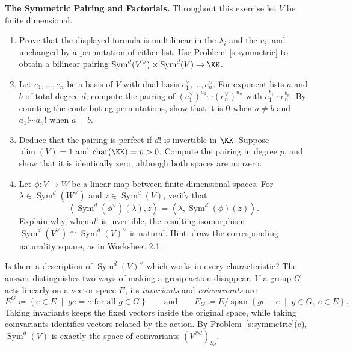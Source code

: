 \documentclass[12pt,reqno]{amsart}
\DeclareMathOperator{\Sym}{Sym}
\begin{document}
\begin{problems}
\item\label{s:pairing} \textbf{The Symmetric Pairing and Factorials.} Throughout this exercise let $V$ be finite dimensional.
\begin{enumerate}
\item Prove that the displayed formula is multilinear in the $\lambda_i$ and the $v_i$, and unchanged by a permutation of either list. Use Problem~\ref{s:symmetric} to obtain a bilinear pairing $\Sym^d(V^{\vee})\times\Sym^d(V)\to\KK$.
\item Let $e_1,\ldots,e_n$ be a basis of $V$ with dual basis $e_1^{\vee},\ldots,e_n^{\vee}$. For exponent lists $a$ and $b$ of total degree $d$, compute the pairing of $(e_1^{\vee})^{a_1}\cdots(e_n^{\vee})^{a_n}$ with $e_1^{b_1}\cdots e_n^{b_n}$. By counting the contributing permutations, show that it is $0$ when $a\ne b$ and $a_1!\cdots a_n!$ when $a=b$.
\item Deduce that the pairing is perfect if $d!$ is invertible in $\KK$. Suppose $\dim(V)=1$ and $\operatorname{char}(\KK)=p>0$. Compute the pairing in degree $p$, and show that it is identically zero, although both spaces are nonzero.
\item Let $\phi:V\to W$ be a linear map between finite-dimensional spaces. For $\lambda\in\Sym^d(W^{\vee})$ and $z\in\Sym^d(V)$, verify that
\[
\left\langle\Sym^d(\phi^{\vee})(\lambda),z\right\rangle=\left\langle\lambda,\Sym^d(\phi)(z)\right\rangle.
\]
Explain why, when $d!$ is invertible, the resulting isomorphism $\Sym^d(V^{\vee})\cong\Sym^d(V)^{\vee}$ is natural. Hint: draw the corresponding naturality square, as in Worksheet 2.1.
\end{enumerate}
\end{problems}

\hrulefill

Is there a description of $\Sym^d(V)^{\vee}$ which works in every characteristic? The answer distinguishes two ways of making a group action disappear. If a group $G$ acts linearly on a vector space $E$, its \emph{invariants} and \emph{coinvariants} are
\[
E^G\coloneqq\left\{e\in E \;\; \big| \;\; ge=e\text{ for all }g\in G\right\}
\qquad\text{and}\qquad
E_G\coloneqq E/\operatorname{span}\left\{ge-e \;\; \big| \;\; g\in G,\ e\in E\right\}.
\]
Taking invariants keeps the fixed vectors inside the original space, while taking coinvariants identifies vectors related by the action. By Problem~\ref{s:symmetric}(c), $\Sym^d(V)$ is exactly the space of coinvariants $(V^{\otimes d})_{S_d}$.
\end{document}
